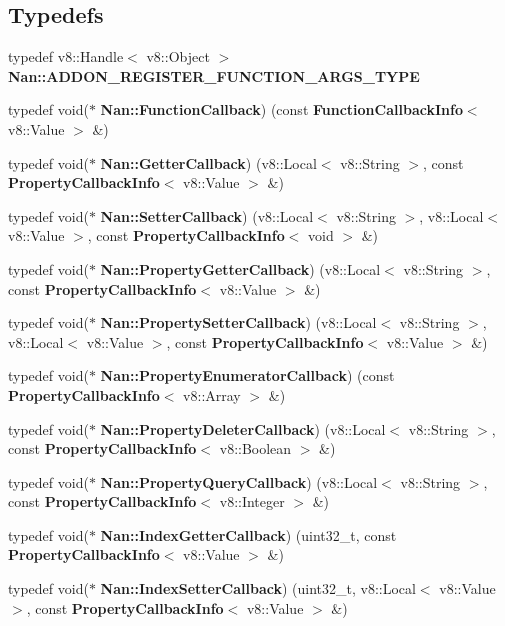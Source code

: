 \subsection*{Typedefs}
\begin{DoxyCompactItemize}
\item 
typedef v8\+::\+Handle$<$ v8\+::\+Object $>$ \textbf{ Nan\+::\+A\+D\+D\+O\+N\+\_\+\+R\+E\+G\+I\+S\+T\+E\+R\+\_\+\+F\+U\+N\+C\+T\+I\+O\+N\+\_\+\+A\+R\+G\+S\+\_\+\+T\+Y\+PE}
\item 
typedef void($\ast$ \textbf{ Nan\+::\+Function\+Callback}) (const \textbf{ Function\+Callback\+Info}$<$ v8\+::\+Value $>$ \&)
\item 
typedef void($\ast$ \textbf{ Nan\+::\+Getter\+Callback}) (v8\+::\+Local$<$ v8\+::\+String $>$, const \textbf{ Property\+Callback\+Info}$<$ v8\+::\+Value $>$ \&)
\item 
typedef void($\ast$ \textbf{ Nan\+::\+Setter\+Callback}) (v8\+::\+Local$<$ v8\+::\+String $>$, v8\+::\+Local$<$ v8\+::\+Value $>$, const \textbf{ Property\+Callback\+Info}$<$ void $>$ \&)
\item 
typedef void($\ast$ \textbf{ Nan\+::\+Property\+Getter\+Callback}) (v8\+::\+Local$<$ v8\+::\+String $>$, const \textbf{ Property\+Callback\+Info}$<$ v8\+::\+Value $>$ \&)
\item 
typedef void($\ast$ \textbf{ Nan\+::\+Property\+Setter\+Callback}) (v8\+::\+Local$<$ v8\+::\+String $>$, v8\+::\+Local$<$ v8\+::\+Value $>$, const \textbf{ Property\+Callback\+Info}$<$ v8\+::\+Value $>$ \&)
\item 
typedef void($\ast$ \textbf{ Nan\+::\+Property\+Enumerator\+Callback}) (const \textbf{ Property\+Callback\+Info}$<$ v8\+::\+Array $>$ \&)
\item 
typedef void($\ast$ \textbf{ Nan\+::\+Property\+Deleter\+Callback}) (v8\+::\+Local$<$ v8\+::\+String $>$, const \textbf{ Property\+Callback\+Info}$<$ v8\+::\+Boolean $>$ \&)
\item 
typedef void($\ast$ \textbf{ Nan\+::\+Property\+Query\+Callback}) (v8\+::\+Local$<$ v8\+::\+String $>$, const \textbf{ Property\+Callback\+Info}$<$ v8\+::\+Integer $>$ \&)
\item 
typedef void($\ast$ \textbf{ Nan\+::\+Index\+Getter\+Callback}) (uint32\+\_\+t, const \textbf{ Property\+Callback\+Info}$<$ v8\+::\+Value $>$ \&)
\item 
typedef void($\ast$ \textbf{ Nan\+::\+Index\+Setter\+Callback}) (uint32\+\_\+t, v8\+::\+Local$<$ v8\+::\+Value $>$, const \textbf{ Property\+Callback\+Info}$<$ v8\+::\+Value $>$ \&)

\end{DoxyCompactItemize}
